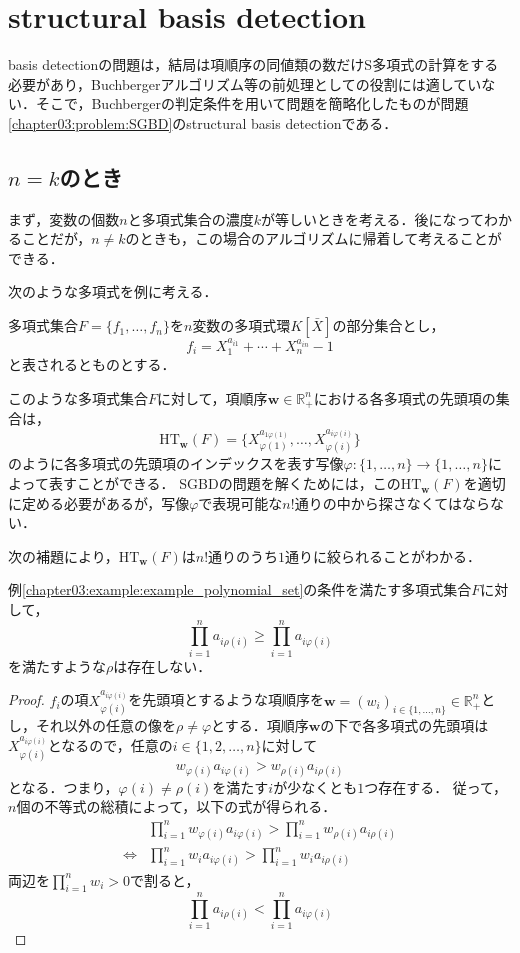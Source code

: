 \section{structural \groebner{} basis detection\cite{sturmfels1997structural}}
\groebner{} basis detectionの問題は，結局は項順序の同値類の数だけS多項式の計算をする必要があり，Buchbergerアルゴリズム等の前処理としての役割には適していない．そこで，Buchbergerの判定条件を用いて問題を簡略化したものが問題\ref{chapter03:problem:SGBD}のstructural \groebner{} basis detectionである．
\subsection{$n = k$のとき}
まず，変数の個数$n$と多項式集合の濃度$k$が等しいときを考える．後になってわかることだが，$n \ne k$のときも，この場合のアルゴリズムに帰着して考えることができる．
\par
次のような多項式を例に考える．
\begin{example}
	\label{chapter03:example:example_polynomial_set}
	多項式集合$F = \{f_1, \dots, f_n\}$を$n$変数の多項式環$K[\bar{X}]$の部分集合とし，
	$$f_i = X_{1}^{a_{i1}} + \cdots + X_n^{a_{in}} - 1$$
	と表されるとものとする．
\end{example}
このような多項式集合$F$に対して，項順序$\bm{w} \in \mathbb{R}_{+}^n$における各多項式の先頭項の集合は，
$$\mathrm{HT}_{\bm{w}}(F) = \{X_{\varphi(1)}^{a_{1\varphi(1)}}, \dots, X_{\varphi(i)}^{a_{i\varphi(i)}}\}$$
のように各多項式の先頭項のインデックスを表す写像$\varphi: \{1, \dots, n\} \to \{1, \dots, n\}$によって表すことができる．
SGBDの問題を解くためには，この$\mathrm{HT}_{\bm{w}}(F)$を適切に定める必要があるが，写像$\varphi$で表現可能な$n!$通りの中から探さなくてはならない．
\par
次の補題により，$\mathrm{HT}_{\bm{w}}(F)$は$n!$通りのうち$1$通りに絞られることがわかる．
\begin{lemma}
	\label{chapter03:lemma:bipartite_graph}
	例\ref{chapter03:example:example_polynomial_set}の条件を満たす多項式集合$F$に対して，
	$$\prod_{i=1}^n a_{i\rho(i)} \ge \prod_{i=1}^n a_{i\varphi(i)}$$
	を満たすような$\rho$は存在しない．
\end{lemma}
\begin{proof}
	$f_i$の項$X_{\varphi(i)}^{a_{i\varphi(i)}}$を先頭項とするような項順序を$\bm{w} = (w_i)_{i \in \{1, \dots, n\}} \in \mathbb{R}_{+}^n$とし，それ以外の任意の像を$\rho \ne \varphi$とする．項順序$\bm{w}$の下で各多項式の先頭項は$X_{\varphi(i)}^{a_{i\varphi(i)}}$となるので，任意の$i \in \{1, 2, \dots, n\}$に対して
	$$w_{\varphi(i)}a_{i\varphi(i)} > w_{\rho(i)}a_{i\rho(i)}$$
	となる．つまり，$\varphi(i) \ne \rho(i)$を満たす$i$が少なくとも$1$つ存在する．
	従って，$n$個の不等式の総積によって，以下の式が得られる．
	\begin{align*}
		& \prod_{i=1}^n w_{\varphi(i)}a_{i\varphi(i)} > \prod_{i=1}^n w_{\rho(i)}a_{i\rho(i)} \\
		\Longleftrightarrow & \prod_{i=1}^n w_i a_{i\varphi(i)} > \prod_{i=1}^n w_i a_{i\rho(i)}
	\end{align*}
	両辺を$\displaystyle \prod_{i=1}^n w_i > 0$で割ると，
	$$\prod_{i=1}^n a_{i\rho(i)} < \prod_{i=1}^n a_{i\varphi(i)}$$
\end{proof}
